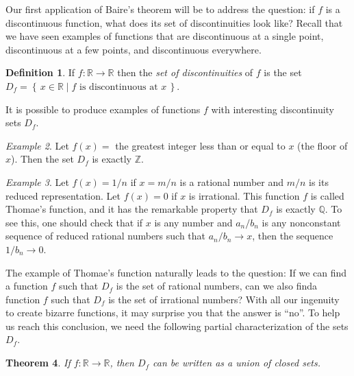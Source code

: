 \documentclass[11pt,oneside]{amsbook}
\newcommand{\set}[1]{\left\{\,#1\,\right\}}
\newcommand{\QQ}{\mathbb Q}
\newcommand{\RR}{\mathbb R}
\theoremstyle{definition}
\theoremstyle{plain}
\newtheorem{thm}{Theorem}[section]
\theoremstyle{definition}
\newtheorem{defn}[thm]{Definition}
\theoremstyle{remark}
\newtheorem{example}[thm]{Example}
\numberwithin{equation}{section}
\numberwithin{figure}{section}
\begin{document}
Our first application of Baire's theorem will be to address the question: if $f$ is a discontinuous function, what does its set of discontinuities look like? Recall that we have seen examples of functions that are discontinuous at a single point, discontinuous at a few points, and discontinuous everywhere.

\begin{defn}
  If $f\colon\RR\to\RR$ then the \emph{set of discontinuities} of $f$ is the set $D_f=\set{x\in\RR\mid\text{$f$ is discontinuous at $x$}}$.
\end{defn}

It is possible to produce examples of functions $f$ with interesting discontinuity sets $D_f$.

\begin{example}
  Let $f(x)=$ the greatest integer less than or equal to $x$ (the floor of $x$). Then the set $D_f$ is exactly $\mathbb Z$.
\end{example}

\begin{example}
  Let $f(x)=1/n$ if $x=m/n$ is a rational number and $m/n$ is its reduced representation. Let $f(x)=0$ if $x$ is irrational. This function $f$ is called Thomae's function, and it has the remarkable property that $D_f$ is exactly $\QQ$. To see this, one should check that if $x$ is any number and $a_n/b_n$ is any nonconstant sequence of reduced rational numbers such that $a_n/b_n\to x$, then the sequence $1/b_n\to0$.
\end{example}


The example of Thomae's function naturally leads to the question: If we can find a function $f$ such that $D_f$ is the set of rational numbers, can we also finda  function $f$ such that $D_f$ is the set of irrational numbers? With all our ingenuity to create bizarre functions, it may surprise you that the answer is ``no''. To help us reach this conclusion, we need the following partial characterization of the sets $D_f$.

\begin{thm}
  \label{thm:df-closed}
  If $f\colon\RR\to\RR$, then $D_f$ can be written as a union of closed sets.
\end{thm}
\end{document}
